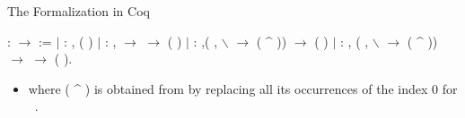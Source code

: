 \documentclass[10pt]{beamer}
\begin{document}
\begin{frame}[fragile]{The Formalization in Coq}

  \begin{coqdoccode}
    \coqdocemptyline \coqdocnoindent {}
     :  \ensuremath{\rightarrow}
     :=\coqdoceol \coqdocindent{1.00em} \ensuremath{|}
     : \coqdockw{\ensuremath{\forall}}
    ,  (
    )\coqdoceol \coqdocindent{1.00em} \ensuremath{|}
     : \coqdockw{\ensuremath{\forall}}
     , 
    \ensuremath{\rightarrow}  
    \ensuremath{\rightarrow} \coqdoceol \coqdocindent{9.00em}
     ( 
    )\coqdoceol \coqdocindent{1.00em} \ensuremath{|}
     : \coqdockw{\ensuremath{\forall}}
     ,(\coqdockw{\ensuremath{\forall}}
    ,  $\backslash$
     \ensuremath{\rightarrow} 
    ( \^{} ))
    \ensuremath{\rightarrow}\coqdoceol \coqdocindent{18.00em}
     ( )\coqdoceol
    \coqdocindent{1.00em} \ensuremath{|}  :
    \coqdockw{\ensuremath{\forall}}  
    , (\coqdockw{\ensuremath{\forall}} ,
     $\backslash$ 
    \ensuremath{\rightarrow}  ( \^{}
    )) \ensuremath{\rightarrow}\coqdoceol
    \coqdocindent{12.00em}  
    \ensuremath{\rightarrow}  (
     ).\coqdoceol
  \end{coqdoccode}

  \begin{itemize}
  \item where ( \^{} ) is obtained from
     by replacing all its occurrences of the index 0 for
    ~\cite{Ch11}.
  \end{itemize}
\end{frame}
\end{document}
